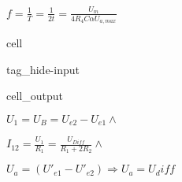 \documentclass[letterpaper,10pt,english]{jupyterBook}
\begin{document}
\sphinxAtStartPar
\(f = \frac{1}{T} = \frac{1}{2t} = \frac{U_m}{4R_4 C \alpha U_{a, max}}\)

\begin{DUlineblock}{0em}
\item[] 
\end{DUlineblock}

\begin{DUlineblock}{0em}
\item[] 
\end{DUlineblock}

\begin{DUlineblock}{0em}
\item[] 
\end{DUlineblock}

\begin{sphinxuseclass}{cell}
\begin{sphinxuseclass}{tag_hide-input}\begin{sphinxVerbatimOutput}

\begin{sphinxuseclass}{cell_output}
\noindent{}

\end{sphinxuseclass}\end{sphinxVerbatimOutput}

\end{sphinxuseclass}
\end{sphinxuseclass}
\begin{DUlineblock}{0em}
\item[] 
\end{DUlineblock}

\sphinxAtStartPar
{}

\begin{DUlineblock}{0em}
\item[] 
\end{DUlineblock}

\sphinxAtStartPar
\(U_{1} = U_B = U_{e2} - U_{e1} \wedge\)

\sphinxAtStartPar
\(I_{12} = \frac{U_1}{R_1} = \frac{U_{Diff}}{R_1 + 2R_2}\wedge\)

\sphinxAtStartPar
\(U_a = (U'_{e1} - U'_{e2}) \Rightarrow U_a = U_diff\)
\end{document}
